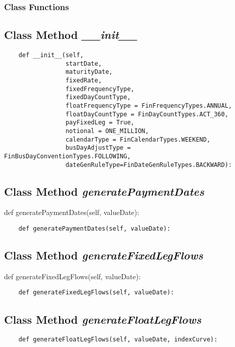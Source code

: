 \documentclass[twoside,11pt]{book}
\begin{document}
\subsubsection{Class Functions}

\subsection{Class Method {\it \_\_init\_\_}}


\begin{lstlisting}
    def __init__(self, 
                 startDate, 
                 maturityDate, 
                 fixedRate,
                 fixedFrequencyType,
                 fixedDayCountType,
                 floatFrequencyType = FinFrequencyTypes.ANNUAL,
                 floatDayCountType = FinDayCountTypes.ACT_360, 
                 payFixedLeg = True, 
                 notional = ONE_MILLION,
                 calendarType = FinCalendarTypes.WEEKEND,
                 busDayAdjustType = FinBusDayConventionTypes.FOLLOWING,
                 dateGenRuleType=FinDateGenRuleTypes.BACKWARD):
\end{lstlisting}

\subsection{Class Method {\it generatePaymentDates}}
def generatePaymentDates(self, valueDate):

\begin{lstlisting}
    def generatePaymentDates(self, valueDate):
\end{lstlisting}

\subsection{Class Method {\it generateFixedLegFlows}}
def generateFixedLegFlows(self, valueDate):

\begin{lstlisting}
    def generateFixedLegFlows(self, valueDate):
\end{lstlisting}

\subsection{Class Method {\it generateFloatLegFlows}}


\begin{lstlisting}
    def generateFloatLegFlows(self, valueDate, indexCurve):
\end{lstlisting}
\end{document}
